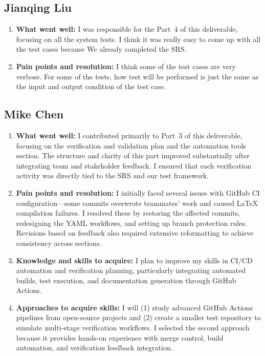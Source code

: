 \documentclass[12pt, titlepage]{article}
\begin{document}
\subsection*{Jianqing Liu}
\begin{enumerate}
  \item \textbf{What went well:}
        I was responsible for the Part~4 of this deliverable, focusing on all the system tests. I think it
        was really easy to come up with all the test cases because We already completed the SRS.

  \item \textbf{Pain points and resolution:}
        I think some of the test cases are very verbose. For some of the tests, how test will be performed
        is just the same as the input and output condition of the test case.
\end{enumerate}

\subsection*{Mike Chen}
\begin{enumerate}
  \item \textbf{What went well:}
        I contributed primarily to Part~3 of this deliverable, focusing on the verification and validation plan
        and the automation tools section. The structure and clarity of this part improved substantially after
        integrating team and stakeholder feedback. I ensured that each verification activity was directly tied
        to the SRS and our test framework.

  \item \textbf{Pain points and resolution:}
        I initially faced several issues with GitHub CI configuration—some commits overwrote teammates’
        work and caused LaTeX compilation failures. I resolved these by restoring the affected commits,
        redesigning the YAML workflows, and setting up branch protection rules. Revisions based on
        feedback also required extensive reformatting to achieve consistency across sections.

  \item \textbf{Knowledge and skills to acquire:}
        I plan to improve my skills in CI/CD automation and verification planning, particularly integrating
        automated builds, test execution, and documentation generation through GitHub Actions.

  \item \textbf{Approaches to acquire skills:}
        I will (1) study advanced GitHub Actions pipelines from open-source projects and (2) create a
        smaller test repository to simulate multi-stage verification workflows. I selected the second
        approach because it provides hands-on experience with merge control, build automation, and
        verification feedback integration.
\end{enumerate}
\end{document}
